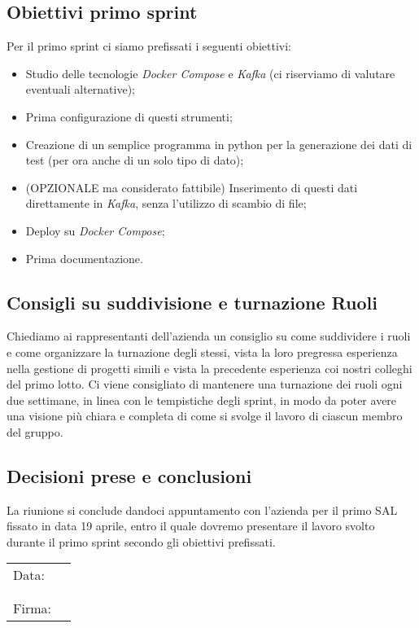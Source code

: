 \documentclass[italian,12pt]{article}
\begin{document}
\subsection{Obiettivi primo sprint}
Per il primo sprint ci siamo prefissati i seguenti obiettivi:
\begin{itemize}
	\item Studio delle tecnologie \textit{Docker Compose} e \textit{Kafka} (ci riserviamo di valutare eventuali alternative);
	\item Prima configurazione di questi strumenti;
	\item Creazione di un semplice programma in python per la generazione dei dati di test (per ora anche di un solo tipo di dato);
	\item (OPZIONALE ma considerato fattibile) Inserimento di questi dati direttamente in \textit{Kafka}, senza l'utilizzo di scambio di file;
	\item Deploy su \textit{Docker Compose};
	\item Prima documentazione.
\end{itemize}

\subsection{Consigli su suddivisione e turnazione Ruoli}
Chiediamo ai rappresentanti dell'azienda un consiglio su come suddividere i ruoli e come 
organizzare la turnazione degli stessi, vista la loro pregressa esperienza nella gestione 
di progetti simili e vista la precedente esperienza coi nostri colleghi del primo lotto. 
Ci viene consigliato di mantenere una turnazione dei ruoli ogni due settimane, in linea con 
le tempistiche degli sprint, in modo da poter avere una visione più chiara e completa di 
come si svolge il lavoro di ciascun membro del gruppo.

\subsection{Decisioni prese e conclusioni}
La riunione si conclude dandoci appuntamento con l'azienda per il primo SAL fissato 
in data 19 aprile, entro il quale dovremo presentare il lavoro svolto durante il primo sprint 
secondo gli obiettivi prefissati.

\newpage
\begin{table}[b]
	\begin{tabular}{@{}p{.5in}p{4in}@{}}
		Data:  & \hrulefill \\
			   &     		\\
			   &     		\\
		Firma: & \hrulefill \\
	\end{tabular}
	\end{table}
\end{document}
